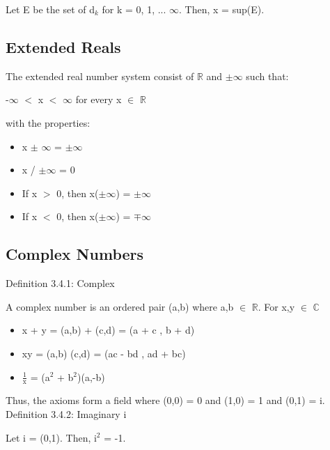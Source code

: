 	Let E be the set of d$_k$ for k = 0, 1, ... $\infty$. Then, x = sup(E).





\subsection{Extended Reals}

	The extended real number system consist of $\mathbb{R}$ and $\pm$$\infty$ such that:

	\qquad -$\infty$ $<$ x $<$ $\infty$	\qquad for every x $\in$ $\mathbb{R}$

	with the properties:
	\begin{itemize}[leftmargin=2cm, itemsep=0.4em]
		\item x $\pm$ $\infty$ = $\pm$$\infty$
	
		\item x / $\pm$$\infty$ = 0

		\item If x $>$ 0, then x($\pm$$\infty$) = $\pm$$\infty$

		\item If x $<$ 0, then x($\pm$$\infty$) = $\mp$$\infty$
	\end{itemize}





\subsection{Complex Numbers}

{ \color{blue} Definition 3.4.1: Complex } 
	
	\qquad A complex number is an ordered pair (a,b) where a,b $\in$ $ \mathbb{R} $.
	For x,y $\in$ $\mathbb{C}$
	\begin{itemize}[leftmargin=2cm, itemsep=0.4em]
		\item x + y = (a,b) + (c,d) = (a + c , b + d)
		\item xy = (a,b) (c,d) = (ac - bd , ad + bc)
		\item $\frac{1}{\text{x}}$  = (a$^2$ + b$^2$)(a,-b)
	\end{itemize}

	Thus, the axioms form a field where (0,0) = 0 and (1,0) = 1 and (0,1) = i. \\

{ \color{blue} Definition 3.4.2: Imaginary i } 
	
	\qquad Let i = (0,1). Then, i$^2$ = -1.

